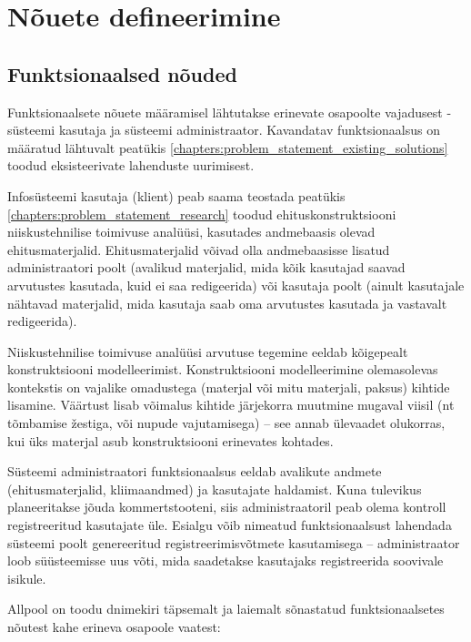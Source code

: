 \section{Nõuete defineerimine}
\label{chapters:analysis_requirements}
\subsection{Funktsionaalsed nõuded}
\label{subsec_func_req}
Funktsionaalsete nõuete määramisel lähtutakse erinevate osapoolte vajadusest - süsteemi kasutaja ja süsteemi 
administraator. Kavandatav funktsionaalsus on määratud lähtuvalt peatükis \ref{chapters:problem_statement_existing_solutions} toodud
eksisteerivate lahenduste uurimisest.

Infosüsteemi kasutaja (klient) peab saama teostada peatükis \ref{chapters:problem_statement_research} toodud ehituskonstruktsiooni niiskustehnilise toimivuse analüüsi,
kasutades andmebaasis olevad ehitusmaterjalid. Ehitusmaterjalid võivad olla andmebaasisse lisatud administraatori poolt (avalikud materjalid, mida kõik kasutajad 
saavad arvutustes kasutada, kuid ei saa redigeerida) või kasutaja poolt (ainult kasutajale nähtavad materjalid, mida kasutaja saab oma arvutustes kasutada ja vastavalt redigeerida).

Niiskustehnilise toimivuse analüüsi arvutuse tegemine eeldab kõigepealt konstruktsiooni modelleerimist. Konstruktsiooni modelleerimine olemasolevas kontekstis on vajalike omadustega
(materjal või mitu materjali, paksus) kihtide lisamine. Väärtust lisab võimalus kihtide järjekorra muutmine mugaval viisil (nt tõmbamise žestiga, või nupude vajutamisega) -- see annab
ülevaadet olukorras, kui üks materjal asub konstruktsiooni erinevates kohtades.

Süsteemi administraatori funktsionaalsus eeldab avalikute andmete (ehitusmaterjalid, kliimaandmed) ja kasutajate haldamist. Kuna tulevikus planeeritakse jõuda kommertstooteni, siis
administraatoril peab olema kontroll registreeritud kasutajate üle. Esialgu võib nimeatud funktsionaalsust lahendada süsteemi poolt genereeritud registreerimisvõtmete kasutamisega 
-- administraator loob süüsteemisse uus võti, mida saadetakse kasutajaks registreerida soovivale isikule.

Allpool on toodu dnimekiri täpsemalt ja laiemalt sõnastatud funktsionaalsetes nõutest kahe erineva osapoole vaatest:

